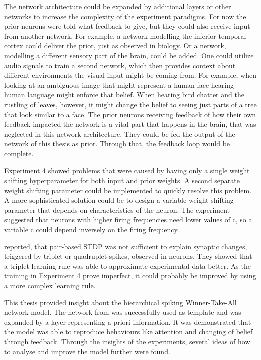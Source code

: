 The network architecture could be expanded by additional layers or other networks to increase the complexity of the experiment paradigms. For now the prior neurons were told what feedback to give, but they could also receive input from another network. For example, a network modelling the inferior temporal cortex could deliver the prior, just as observed in biology. 
Or a network, modelling a different sensory part of the brain, could be added. One could utilize audio signals to train a second network, which then provides context about different environments the visual input might be coming from. For example, when looking at an ambiguous image that might represent a human face hearing human language might enforce that belief. When hearing bird chatter and the rustling of leaves, however, it might change the belief to seeing just parts of a tree that look similar to a face.  
The prior neurons receiving feedback of how their own feedback impacted the network is a vital part that happens in the brain, that was neglected in this network architecture. They could be fed the output of the network of this thesis as prior. Through that, the feedback loop would be complete.

Experiment 4 showed problems that were caused by having only a single weight shifting hyperparameter for both input and prior weights. A second separate weight shifting parameter could be implemented to quickly resolve this problem. A more sophisticated solution could be to design a variable weight shifting parameter that depends on characteristics of the neuron. The experiment suggested that neurons with higher firing frequencies need lower values of c, so a variable c could depend inversely on the firing frequency.

\citet{triplets} reported, that pair-based STDP was not sufficient to explain synaptic changes, triggered by triplet or quadruplet spikes, observed in neurons. They showed that a triplet learning rule was able to approximate experimental data better. As the training in Experiment 4 prove imperfect, it could probably be improved by using a more complex learning rule.

This thesis provided insight about the hierarchical spiking Winner-Take-All network model. The network from \citet{nessler} was successfully used as template and was expanded by a layer representing a-priori information. It was demonstrated that the model was able to reproduce behaviours like attention and changing of belief through feedback. Through the insights of the experiments, several ideas of how to analyse and improve the model further were found.

